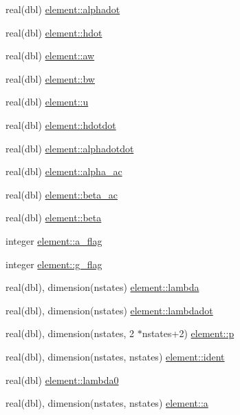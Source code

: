 \begin{DoxyCompactItemize}
\item 
real(dbl) \hyperlink{namespaceelement_ac749aa20088ae7c80700929a64803dfe}{element\+::alphadot}
\item 
real(dbl) \hyperlink{namespaceelement_a50a818b525bc9fc33afce618163cb17e}{element\+::hdot}
\item 
real(dbl) \hyperlink{namespaceelement_a3a0a4401f2461a4b65f656a9af6e23d8}{element\+::aw}
\item 
real(dbl) \hyperlink{namespaceelement_af3dda698afcf40c00ff5008dc5f3da36}{element\+::bw}
\item 
real(dbl) \hyperlink{namespaceelement_a6d48ee96f674959ef1225a3730fcf3e7}{element\+::u}
\item 
real(dbl) \hyperlink{namespaceelement_a012a2b1125e535b957a6be4ea842da6d}{element\+::hdotdot}
\item 
real(dbl) \hyperlink{namespaceelement_a3b4df4c1043c9ebd56f5d23ca24d00ac}{element\+::alphadotdot}
\item 
real(dbl) \hyperlink{namespaceelement_aab90697519f32a9a4f56786465c1bd0b}{element\+::alpha\+\_\+ac}
\item 
real(dbl) \hyperlink{namespaceelement_a9ab0720aafb3053cad927fc402be3000}{element\+::beta\+\_\+ac}
\item 
real(dbl) \hyperlink{namespaceelement_a1ea3f00156313fce1a3de0a00499702c}{element\+::beta}
\item 
integer \hyperlink{namespaceelement_a17661475127df7ce4d09fb1e942cbd58}{element\+::a\+\_\+flag}
\item 
integer \hyperlink{namespaceelement_a4f9b46e901684a30dec91ad363247dd3}{element\+::g\+\_\+flag}
\item 
real(dbl), dimension(nstates) \hyperlink{namespaceelement_abfc6a3777c98caf9d75aa0fa4ce97e17}{element\+::lambda}
\item 
real(dbl), dimension(nstates) \hyperlink{namespaceelement_a627873fe5856f3a9c95039d8f6877039}{element\+::lambdadot}
\item 
real(dbl), dimension(nstates, 2 $\ast$nstates+2) \hyperlink{namespaceelement_abf487a07f5188539bf21883fc0a10c70}{element\+::p}
\item 
real(dbl), dimension(nstates, nstates) \hyperlink{namespaceelement_af575d84cfbaeca87aec268f375efac06}{element\+::ident}
\item 
real(dbl) \hyperlink{namespaceelement_aa9695f47555869b8d547d0d87d49275e}{element\+::lambda0}
\item 
real(dbl), dimension(nstates, nstates) \hyperlink{namespaceelement_ad0c7d68510d195a504efc593e729263f}{element\+::a}

\end{DoxyCompactItemize}
